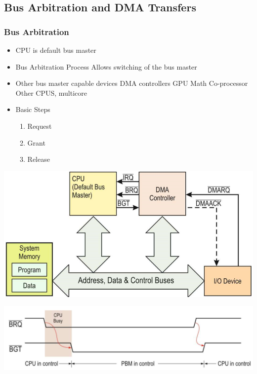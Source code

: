 \subsection{Bus Arbitration and DMA Transfers }
\begin{minipage}{0.5\linewidth}
    \subsubsection{Bus Arbitration}
    \begin{itemize}
        \item CPU is default bus master
        \item Bus Arbitration Process
        \subitem Allows switching of the bus master
        \item Other bus master capable devices
        \subitem DMA controllers
        \subitem GPU
        \subitem Math Co-processor
        \subitem Other CPUS, multicore
        \item Basic Steps
        \begin{enumerate}
            \item Request
            \item Grant
            \item Release
        \end{enumerate}
    \end{itemize}
\end{minipage}
\begin{minipage}{0.5\linewidth}
    \includegraphics[width=\linewidth]{images/BusArbitrationTrans}
    
    \vspace{1cm}
    
    \includegraphics[width=\linewidth]{images/BusArbitrationSchem}
\end{minipage}


